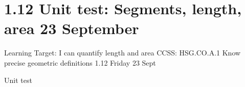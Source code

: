 \documentclass[onlytextwidth]{beamer}
\begin{document}
\section{1.12 Unit test: Segments, length, area \hfill 23 September}
\begin{frame}{Learning Target: I can quantify length and area}
    {CCSS: HSG.CO.A.1 Know precise geometric definitions \hfill \alert{1.12 Friday 23 Sept}}

        \alert{Unit test}
    \end{frame} 
    
    
\end{document}
